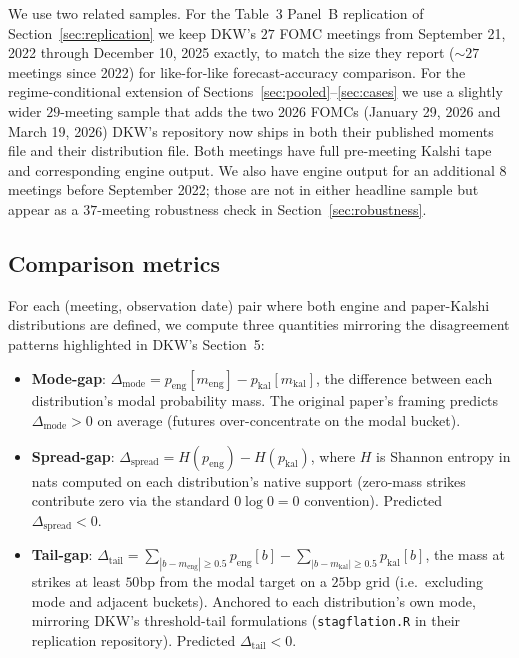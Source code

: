 \documentclass[11pt]{article}
\begin{document}
We use two related samples. For the Table~3 Panel~B replication of
Section~\ref{sec:replication} we keep DKW's $27$ FOMC meetings from
September 21, 2022 through December 10, 2025 exactly, to match the
size they report ($\sim$$27$ meetings since 2022) for like-for-like
forecast-accuracy comparison. For the regime-conditional extension
of Sections~\ref{sec:pooled}--\ref{sec:cases} we use a slightly
wider $29$-meeting sample that adds the two 2026 FOMCs
(January 29, 2026 and March 19, 2026) DKW's repository now ships
in both their published moments file and their distribution file.
Both meetings have full pre-meeting Kalshi tape and corresponding
engine output. We also have engine output for an additional $8$
meetings before September 2022; those are not in either headline
sample but appear as a $37$-meeting robustness check in
Section~\ref{sec:robustness}.

\subsection{Comparison metrics}

For each (meeting, observation date) pair where both engine and
paper-Kalshi distributions are defined, we compute three quantities
mirroring the disagreement patterns highlighted in DKW's Section~5:

\begin{itemize}
\item \textbf{Mode-gap}:
$\Delta_{\mathrm{mode}} = p_{\mathrm{eng}}[m_{\mathrm{eng}}] -
p_{\mathrm{kal}}[m_{\mathrm{kal}}]$, the difference between each
distribution's modal probability mass. The original paper's framing
predicts $\Delta_{\mathrm{mode}} > 0$ on average (futures
over-concentrate on the modal bucket).
\item \textbf{Spread-gap}:
$\Delta_{\mathrm{spread}} = H(p_{\mathrm{eng}}) - H(p_{\mathrm{kal}})$,
where $H$ is Shannon entropy in nats computed on each distribution's
native support (zero-mass strikes contribute zero via the standard
$0 \log 0 = 0$ convention). Predicted $\Delta_{\mathrm{spread}} < 0$.
\item \textbf{Tail-gap}:
$\Delta_{\mathrm{tail}} =
\sum_{|b - m_{\mathrm{eng}}| \geq 0.5} p_{\mathrm{eng}}[b]
- \sum_{|b - m_{\mathrm{kal}}| \geq 0.5} p_{\mathrm{kal}}[b]$,
the mass at strikes at least $50$bp from the modal target on a
$25$bp grid (i.e.\ excluding mode and adjacent buckets). Anchored to
each distribution's own mode, mirroring DKW's threshold-tail
formulations (\texttt{stagflation.R} in their replication
repository). Predicted
$\Delta_{\mathrm{tail}} < 0$.
\end{itemize}
\end{document}
